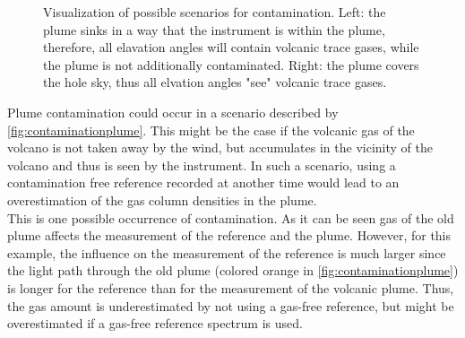 \begin{figure}
	\centering
	\caption[Visualization of possible scenarios for contamination]{Visualization of possible scenarios for contamination. Left: the plume sinks in a way that the instrument is within the plume, therefore, all elavation angles will contain volcanic trace gases, while the plume is not additionally contaminated. Right: the plume covers the hole sky, thus all elvation angles "see" volcanic trace gases. }
	\label{fig:contaminationplumewideplume}
\end{figure}
%
Plume contamination could occur in a scenario described by  \cref{fig:contaminationplume}.
This might be the case if the volcanic gas of the volcano is not taken away by the wind, but accumulates in the vicinity of the volcano and thus is seen by the instrument. In such a scenario, using a contamination free reference recorded at another time would lead to an overestimation of the gas column densities in the plume.\\
This is one possible occurrence of contamination. As it can be seen gas of the old plume affects the measurement of the reference and the plume. However, for this example, the influence on the measurement of the reference is much larger since the light path through the old plume (colored orange in \cref{fig:contaminationplume}) is longer for the reference than for the measurement of the volcanic plume. Thus, the gas amount is underestimated by not using a gas-free reference, but might be overestimated if a gas-free reference spectrum is used.

